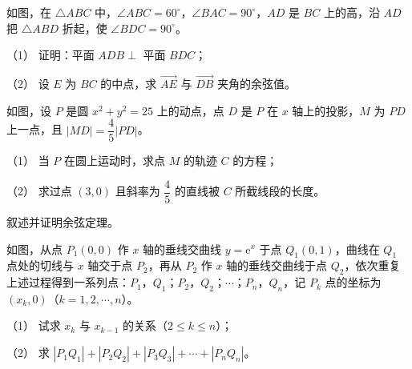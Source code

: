 \Needspace{0.4\textheight}
\begin{question}
如图，在 $\triangle ABC$ 中，$\angle ABC=60^\circ$，$\angle BAC=90^\circ$，$AD$ 是 $BC$ 上的高，沿 $AD$ 把 $\triangle ABD$ 折起，使 $\angle BDC=90^\circ$。

（1） 证明：平面 $ADB\perp$ 平面 $BDC$；

（2） 设 $E$ 为 $BC$ 的中点，求 $\overrightarrow{AE}$ 与 $\overrightarrow{DB}$ 夹角的余弦值。
\nopagebreak[4]
\begin{center}\end{center}
\nopagebreak[4]
\Needspace{0.4\textheight}
\end{question}
\begin{question}
如图，设 $P$ 是圆 $x^2+y^2=25$ 上的动点，点 $D$ 是 $P$ 在 $x$ 轴上的投影，$M$ 为 $PD$ 上一点，且 $|MD|=\dfrac45|PD|$。

（1） 当 $P$ 在圆上运动时，求点 $M$ 的轨迹 $C$ 的方程；

（2） 求过点 $(3,0)$ 且斜率为 $\dfrac45$ 的直线被 $C$ 所截线段的长度。
\nopagebreak[4]
\begin{center}\end{center}
\nopagebreak[4]
\end{question}
\begin{question}
叙述并证明余弦定理。

\Needspace{0.4\textheight}
\end{question}
\begin{question}
如图，从点 $P_1(0,0)$ 作 $x$ 轴的垂线交曲线 $y=\mathrm e^x$ 于点 $Q_1(0,1)$，曲线在 $Q_1$ 点处的切线与 $x$ 轴交于点 $P_2$，再从 $P_2$ 作 $x$ 轴的垂线交曲线于点 $Q_2$，依次重复上述过程得到一系列点：$P_1$，$Q_1$；$P_2$，$Q_2$；$\cdots$；$P_n$，$Q_n$，记 $P_k$ 点的坐标为 $(x_k,0)$（$k=1,2,\cdots,n$）。

（1） 试求 $x_k$ 与 $x_{k-1}$ 的关系（$2\leqslant k\leqslant n$）；

（2） 求 $|P_1Q_1|+|P_2Q_2|+|P_3Q_3|+\cdots+|P_nQ_n|$。
\nopagebreak[4]
\begin{center}\end{center}
\nopagebreak[4]
\Needspace{0.4\textheight}
\end{question}
